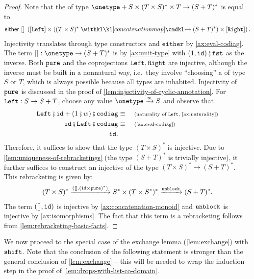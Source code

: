 \begin{proof}
    Note that the  of type $\onetype + S \times (T \times S)^* \times T \rightarrow (S + T)^*$ is equal to
    \[ 
        \either{[]}{\left( [\leftterm] \times ((T \times S)^* \concmap (S + T)^*) \times [\rightterm] \right)}.
    \] 
    Injectivity translates through type constructors and $\mathtt{either}$ by \cref{ax:eval-codiag}. The term $[] : \onetype \rightarrow (S + T)^*$ is  by \cref{ax:unit-type} with $\unitlterm \comp \fstterm$ as the inverse. Both $\mathtt{pure}$ and the coprojections $\mathtt{Left}, \mathtt{Right}$ are injective, although the inverse must be built in a nonnatural way, i.e.~they involve ``choosing'' a  of type $S$ or $T$, which is always possible because all types are inhabited. Injectivity of $\mathtt{pure}$ is discussed in the proof of \cref{lem:injectivity-of-cyclic-annotation}. For $\mathtt{Left} : S \rightarrow S + T$, choose any value $\onetype \xrightarrow{w} S$ and observe that 
    \begin{align*} 
        \leftterm \comp \idterm + (1\comp{}w) \comp \codiagterm \equalbecause{naturality of $\leftterm$, \cref{ax:naturality}} \\
        \idterm \comp \leftterm \comp \codiagterm \equalbecause{\cref{ax:eval-codiag}} \\ 
        \idterm.
    \end{align*}
    Therefore, it suffices to show that the type $(T \times S)^*$ is injective.
    Due to \cref{lem:uniqueness-of-rebracketings} (the type $(S + T)^*$ is trivially injective), it further suffices to construct an injective  of the type $(T \times S)^* \rightarrow (S + T)^*$. This rebracketing is given by:
    \[ 
        (T \times S)^* \xrightarrow{([], \left( \mathtt{id} \times \mathtt{pure} \right)^*)} S^* \times (T \times S^*)^* \xrightarrow{\mathtt{unblock}} (S + T)^*.
    \]
    The term $([], \mathtt{id})$ is injective by \cref{ax:concatenation-monoid} and $\mathtt{unblock}$ is injective by \cref{ax:isomorphisms}. The fact that this term is a rebracketing follows from \cref{lem:rebracketing-basic-facts}.
\end{proof}

We now proceed to the special case of the exchange lemma (\cref{lem:exchange}) with $\mathtt{shift}$. Note that the conclusion of the following statement is stronger than the general conclusion of \cref{lem:exchange} -- this will be needed to wrap the induction step in the proof of \cref{lem:drops-with-list-co-domain}.

